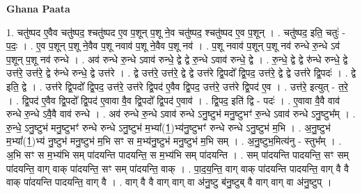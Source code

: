\documentclass[17pt]{extarticle}
\begin{document}
\textbf{Ghana Paata } \newline

1. चतु॑ष्पद ए॒वैव चतु॑ष्पद॒ श्चतु॑ष्पद ए॒व प॒शून् प॒शू ने॒व चतु॑ष्पद॒ श्चतु॑ष्पद ए॒व प॒शून् । . चतु॑ष्पद॒ इति॒ चतुः॑ - प॒दः॒ । . ए॒व प॒शून् प॒शू ने॒वैव प॒शू नवाव॑ प॒शू ने॒वैव प॒शू नव॑ । . प॒शू नवाव॑ प॒शून् प॒शू नव॑ रुन्धे रु॒न्धे ऽव॑ प॒शून् प॒शू नव॑ रुन्धे । . अव॑ रुन्धे रु॒न्धे ऽवाव॑ रुन्धे॒ द्वे द्वे रु॒न्धे ऽवाव॑ रुन्धे॒ द्वे । . रु॒न्धे॒ द्वे द्वे रु॑न्धे रुन्धे॒ द्वे उत्त॑रे॒ उत्त॑रे॒ द्वे रु॑न्धे रुन्धे॒ द्वे उत्त॑रे । . द्वे उत्त॑रे॒ उत्त॑रे॒ द्वे द्वे उत्त॑रे द्वि॒पदो᳚ द्वि॒पद॒ उत्त॑रे॒ द्वे द्वे उत्त॑रे द्वि॒पदः॑ । . द्वे इति॒ द्वे । . उत्त॑रे द्वि॒पदो᳚ द्वि॒पद॒ उत्त॑रे॒ उत्त॑रे द्वि॒पद॑ ए॒वैव द्वि॒पद॒ उत्त॑रे॒ उत्त॑रे द्वि॒पद॑ ए॒व । . उत्त॑रे॒ इत्युत् - त॒रे॒ । . द्वि॒पद॑ ए॒वैव द्वि॒पदो᳚ द्वि॒पद॑ ए॒वावा वै॒व द्वि॒पदो᳚ द्वि॒पद॑ ए॒वाव॑ । . द्वि॒पद॒ इति॑ द्वि - पदः॑ । . ए॒वावा वै॒वै वाव॑ रुन्धे रु॒न्धे ऽवै॒वै वाव॑ रुन्धे । . अव॑ रुन्धे रु॒न्धे ऽवाव॑ रुन्धे ऽनु॒ष्टुभ॑ मनु॒ष्टुभꣳ॑ रु॒न्धे ऽवाव॑ रुन्धे ऽनु॒ष्टुभ᳚म् । . रु॒न्धे॒ ऽनु॒ष्टुभ॑ मनु॒ष्टुभꣳ॑ रुन्धे रुन्धे ऽनु॒ष्टुभ॑ म॒भ्या᳚(1॒)भ्य॑नु॒ष्टुभꣳ॑ रुन्धे रुन्धे ऽनु॒ष्टुभ॑ म॒भि । . अ॒नु॒ष्टुभ॑ म॒भ्या᳚(1॒)भ्य॑ नु॒ष्टुभ॑ मनु॒ष्टुभ॑ म॒भि सꣳ स म॒भ्य॑नु॒ष्टुभ॑ मनु॒ष्टुभ॑ म॒भि सम् । . अ॒नु॒ष्टुभ॒मित्य॑नु - स्तुभ᳚म् । . अ॒भि सꣳ स म॒भ्य॑भि सम् पा॑दयन्ति पादयन्ति॒ स म॒भ्य॑भि सम् पा॑दयन्ति । . सम् पा॑दयन्ति पादयन्ति॒ सꣳ सम् पा॑दयन्ति॒ वाग् वाक् पा॑दयन्ति॒ सꣳ सम् पा॑दयन्ति॒ वाक् । . पा॒द॒य॒न्ति॒ वाग् वाक् पा॑दयन्ति पादयन्ति॒ वाग् वै वै वाक् पा॑दयन्ति पादयन्ति॒ वाग् वै । . वाग् वै वै वाग् वाग् वा अ॑नु॒ष्टु ब॑नु॒ष्टुब् वै वाग् वाग् वा अ॑नु॒ष्टुप् । \newline
\end{document}
